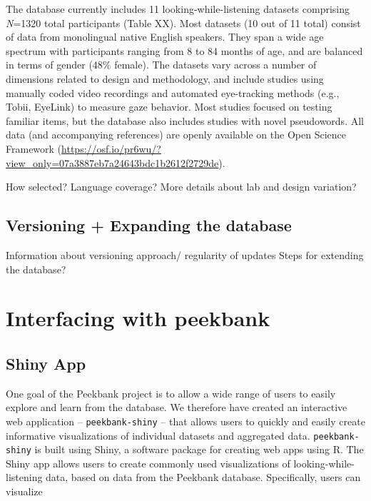 \documentclass[
  english,
  man,floatsintext]{apa6}
\begin{document}
The database currently includes 11 looking-while-listening datasets comprising \emph{N}=1320 total participants (Table XX). Most datasets (10 out of 11 total) consist of data from monolingual native English speakers. They span a wide age spectrum with participants ranging from 8 to 84 months of age, and are balanced in terms of gender (48\% female). The datasets vary across a number of dimensions related to design and methodology, and include studies using manually coded video recordings and automated eye-tracking methods (e.g., Tobii, EyeLink) to measure gaze behavior. Most studies focused on testing familiar items, but the database also includes studies with novel pseudowords. All data (and accompanying references) are openly available on the Open Science Framework (\url{https://osf.io/pr6wu/?view_only=07a3887eb7a24643bdc1b2612f2729de}).

How selected?
Language coverage?
More details about lab and design variation?

\hypertarget{versioning-expanding-the-database}{%
\subsection{Versioning + Expanding the database}\label{versioning-expanding-the-database}}

Information about versioning approach/ regularity of updates
Steps for extending the database?

\hypertarget{interfacing-with-peekbank}{%
\section{Interfacing with peekbank}\label{interfacing-with-peekbank}}

\hypertarget{shiny-app}{%
\subsection{Shiny App}\label{shiny-app}}

One goal of the Peekbank project is to allow a wide range of users to easily explore and learn from the database.
We therefore have created an interactive web application -- \texttt{peekbank-shiny} -- that allows users to quickly and easily create informative visualizations of individual datasets and aggregated data.
\texttt{peekbank-shiny} is built using Shiny, a software package for creating web apps using R.
The Shiny app allows users to create commonly used visualizations of looking-while-listening data, based on data from the Peekbank database.
Specifically, users can visualize
\end{document}
